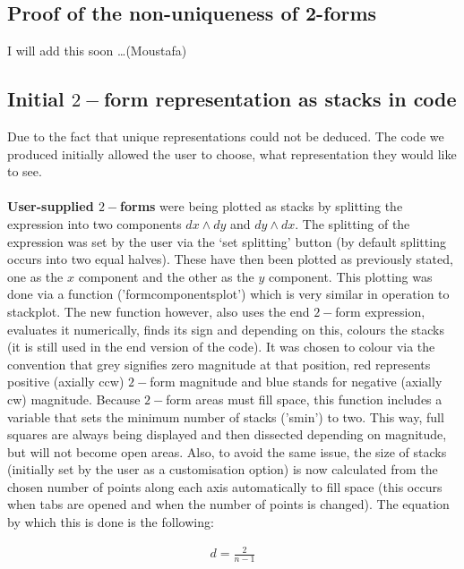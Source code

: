 \documentclass[12pt]{report}
\begin{document}
\subsection{Proof of the non-uniqueness of 2-forms}

I will add this soon \dots (Moustafa)

\subsection{Initial $2-$form representation as stacks in code}
Due to the fact that unique representations could not be deduced. The code we produced initially allowed the user to choose, what representation they would like to see.\\~\\

\textbf{User-supplied $2-$forms} were being plotted as stacks by splitting the expression into two components $dx\wedge dy$ and $dy\wedge dx$. The splitting of the expression was set by the user via the `set splitting' button (by default splitting occurs into two equal halves). These have then been plotted as previously stated, one as the $x$ component and the other as the $y$ component. This plotting was done via a function ('form\textunderscore components\textunderscore plot') which is very similar in operation to stack\textunderscore plot. The new function however, also uses the end $2-$form expression, evaluates it numerically, finds its sign and depending on this, colours the stacks (it is still used in the end version of the code). It was chosen to colour via the convention that grey signifies zero magnitude at that position, red represents positive (axially ccw) $2-$form magnitude and blue stands for negative (axially cw) magnitude. Because $2-$form areas must fill space, this function includes a variable that sets the minimum number of stacks ('s\textunderscore min') to two. This way, full squares are always being displayed and then dissected depending on magnitude, but will not become open areas. Also, to avoid the same issue, the size of stacks (initially set by the user as a customisation option) is now calculated from the chosen number of points along each axis automatically to fill space (this occurs when tabs are opened and when the number of points is changed). The equation by which this is done is the following:

\begin{equation}
	\label{T2} \begin{split}
		d = \frac{2}{n-1}
	\end{split}
\end{equation}
\end{document}
